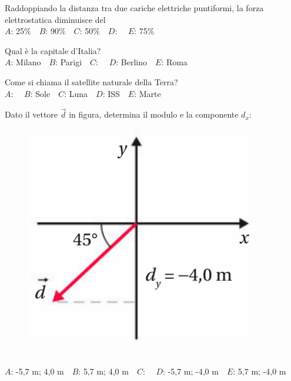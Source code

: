 \mcquestionfooter



\def\mcquestionnumber{10}


\mcquestionheader Raddoppiando la distanza tra due cariche elettriche puntiformi, la forza elettrostatica diminuisce del\\
{$A$}: 25\%\ \ {$B$}: 90\%\ \ {$C$}: 50\%\ \ {$D$}: \ \ {$E$}: 75\%\ \ 

\mcquestionfooter



\def\mcquestionnumber{11}


\mcquestionheader Qual è la capitale d’Italia?\\
{$A$}: Milano\ \ {$B$}: Parigi\ \ {$C$}: \ \ {$D$}: Berlino\ \ {$E$}: Roma\ \ 

\mcquestionfooter



\def\mcquestionnumber{12}


\mcquestionheader Come si chiama il satellite naturale della Terra?\\
{$A$}: \ \ {$B$}: Sole\ \ {$C$}: Luna\ \ {$D$}: ISS\ \ {$E$}: Marte\ \ 

\mcquestionfooter



\mcpaperfooter

\def\mcserialnumber{16}
\mcpaperheader


\def\mcquestionnumber{1}


\mcquestionheader Dato il vettore $\vec{d}$ in figura, determina il modulo e la componente $d_x$: \begin{figure}[h!]   \begin{center}     \includegraphics[scale=0.35]{vettored.png}   \end{center} \end{figure}\\
{$A$}: -5,7 m; 4,0 m\ \ {$B$}: 5,7 m; 4,0 m\ \ {$C$}: \ \ {$D$}: -5,7 m; -4,0 m\ \ {$E$}: 5,7 m; -4,0 m\ \ 

